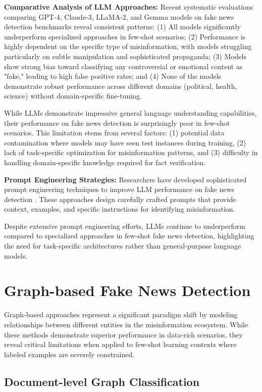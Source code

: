 \textbf{Comparative Analysis of LLM Approaches:} Recent systematic evaluations comparing GPT-4, Claude-3, LLaMA-2, and Gemma models on fake news detection benchmarks reveal consistent patterns: (1) All models significantly underperform specialized approaches in few-shot scenarios; (2) Performance is highly dependent on the specific type of misinformation, with models struggling particularly on subtle manipulation and sophisticated propaganda; (3) Models show strong bias toward classifying any controversial or emotional content as "fake," leading to high false positive rates; and (4) None of the models demonstrate robust performance across different domains (political, health, science) without domain-specific fine-tuning.

While LLMs demonstrate impressive general language understanding capabilities, their performance on fake news detection is surprisingly poor in few-shot scenarios. This limitation stems from several factors: (1) potential data contamination where models may have seen test instances during training, (2) lack of task-specific optimization for misinformation patterns, and (3) difficulty in handling domain-specific knowledge required for fact verification.

\textbf{Prompt Engineering Strategies:} Researchers have developed sophisticated prompt engineering techniques to improve LLM performance on fake news detection \cite{wang2023survey}. These approaches design carefully crafted prompts that provide context, examples, and specific instructions for identifying misinformation.

Despite extensive prompt engineering efforts, LLMs continue to underperform compared to specialized approaches in few-shot fake news detection, highlighting the need for task-specific architectures rather than general-purpose language models.

\section{Graph-based Fake News Detection}

Graph-based approaches represent a significant paradigm shift by modeling relationships between different entities in the misinformation ecosystem. While these methods demonstrate superior performance in data-rich scenarios, they reveal critical limitations when applied to few-shot learning contexts where labeled examples are severely constrained.

\subsection{Document-level Graph Classification}

